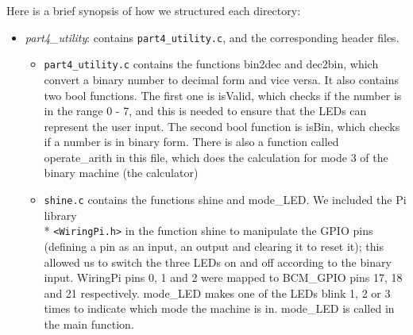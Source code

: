 \documentclass[letterpaper,11pt]{article}
\begin{document}
    \noindent Here is a brief synopsis of how we structured each directory:

    \begin{itemize}
        \item \textit{part4\_utility}: contains \texttt{part4\_utility.c},  and the corresponding header files.
        \begin{itemize}
            \item \texttt{part4\_utility.c} contains the functions bin2dec and dec2bin, which convert a binary number to decimal form and vice versa. It also contains two bool functions. The first one is isValid, which checks if the number is in the range 0 - 7, and this is needed to ensure that the LEDs can represent the user input. The second bool function is isBin, which checks if a number is in binary form. There is also a function called operate\_arith in this file, which does the calculation for mode 3 of the binary machine (the calculator)

            \item \texttt{shine.c} contains the functions shine and mode\_LED. We included the Pi library \\* \texttt{<WiringPi.h>} in the function shine to manipulate the GPIO pins (defining a pin as an input, an output and clearing it to reset it); this allowed us to switch the three LEDs on and off according to the binary input. WiringPi pins 0, 1 and 2 were mapped to BCM\_GPIO pins 17, 18 and 21 respectively. mode\_LED makes one of the LEDs blink 1, 2 or 3 times to indicate which mode the machine is in. mode\_LED is called in the main function.
        \end{itemize}


\end{itemize}
\end{document}

